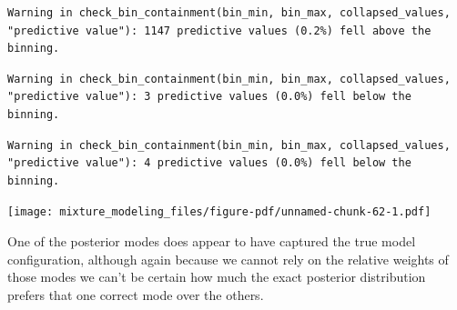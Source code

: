 \documentclass[
  letterpaper,
  DIV=11,
  numbers=noendperiod]{scrartcl}
\newenvironment{Shaded}{\begin{snugshade}}{\end{snugshade}}
\newcommand{\AttributeTok}[1]{\textcolor[rgb]{0.40,0.45,0.13}{#1}}
\newcommand{\ControlFlowTok}[1]{\textcolor[rgb]{0.00,0.23,0.31}{#1}}
\newcommand{\DecValTok}[1]{\textcolor[rgb]{0.68,0.00,0.00}{#1}}
\newcommand{\FloatTok}[1]{\textcolor[rgb]{0.68,0.00,0.00}{#1}}
\newcommand{\FunctionTok}[1]{\textcolor[rgb]{0.28,0.35,0.67}{#1}}
\newcommand{\NormalTok}[1]{\textcolor[rgb]{0.00,0.23,0.31}{#1}}
\newcommand{\OtherTok}[1]{\textcolor[rgb]{0.00,0.23,0.31}{#1}}
\newcommand{\SpecialCharTok}[1]{\textcolor[rgb]{0.37,0.37,0.37}{#1}}
\newcommand{\StringTok}[1]{\textcolor[rgb]{0.13,0.47,0.30}{#1}}
\begin{document}
\begin{Shaded}
\end{Shaded}

\begin{verbatim}
Warning in check_bin_containment(bin_min, bin_max, collapsed_values,
"predictive value"): 1147 predictive values (0.2%) fell above the binning.
\end{verbatim}

\begin{verbatim}
Warning in check_bin_containment(bin_min, bin_max, collapsed_values,
"predictive value"): 3 predictive values (0.0%) fell below the binning.
\end{verbatim}

\begin{verbatim}
Warning in check_bin_containment(bin_min, bin_max, collapsed_values,
"predictive value"): 4 predictive values (0.0%) fell below the binning.
\end{verbatim}

\texttt{[image: mixture\_modeling\_files/figure-pdf/unnamed-chunk-62-1.pdf]}

One of the posterior modes does appear to have captured the true model
configuration, although again because we cannot rely on the relative
weights of those modes we can't be certain how much the exact posterior
distribution prefers that one correct mode over the others.
\end{document}
